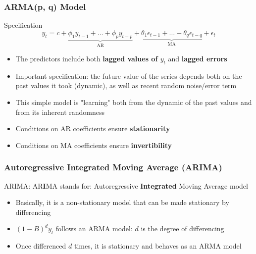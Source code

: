 \documentclass{beamer}
\begin{document}
\begin{frame}
  \frametitle{ARMA(p, q) Model}
  \begin{block}{Specification}
    \begin{equation*}
      y_t = c + \underbrace{\phi_1 y_{t-1} + \dots + \phi_p y_{t-p}}_{\text{AR}} + \underbrace{\theta_1 \epsilon_{t-1} + \dots + \theta_q \epsilon_{t-q}}_{\text{MA}} + \epsilon_t
    \end{equation*}
  \end{block}

  \medskip

  \begin{itemize}
  \item The predictors include both \textbf{lagged values of $y_t$} and \textbf{lagged errors}
  \item Important specification: the future value of the series depends both on the past values it took (dynamic), as well as recent random noise/error term 
  \item This simple model is "learning" both from the dynamic of the past values and from its inherent randomness
  \item Conditions on AR coefficients ensure \textbf{stationarity}
  \item Conditions on MA coefficients ensure \textbf{invertibility}
  \end{itemize}
  
\end{frame}

\begin{frame}
  \frametitle{Autoregressive Integrated Moving Average (ARIMA)}

  ARIMA: AR\textbf{I}MA stands for: Autoregressive \textbf{Integrated} Moving Average model

  \begin{itemize}
  \item Basically, it is a non-stationary model that can be made stationary by differencing
  \item $(1-B)^d y_t$ follows an ARMA model: $d$ is the degree of differencing
  \item Once differenced $d$ times, it is stationary and behaves as an ARMA model
  \end{itemize}  
\end{frame}
\end{document}
